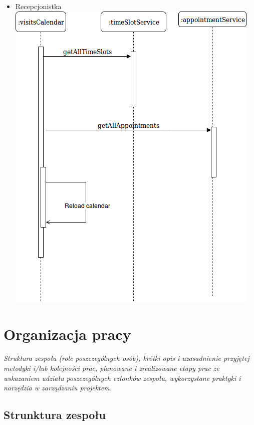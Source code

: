 \documentclass[polish,12pt]{aghthesis}
\begin{document}
\begin{itemize}
    \item Recepcjonistka \\
    \includegraphics[width=\textwidth]{cal-recep-init}
\end{itemize}




\section{Organizacja pracy}
\label{sec:organizacja-pracy}

\emph{Struktura zespołu (role poszczególnych osób), krótki opis i
  uzasadnienie przyjętej metodyki i/lub kolejności prac, planowane i
  zrealizowane etapy prac ze wskazaniem udziału poszczególnych
  członków zespołu, wykorzystane praktyki i narzędzia w zarządzaniu
  projektem.}
  
\subsection{Strunktura zespołu}
\end{document}
